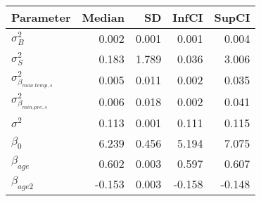 \begin{table}[ht]
\centering
\begin{tabular}{lrrrr}
  \hline
Parameter & Median & SD & InfCI & SupCI \\ 
  \hline
$\sigma^{2}_{B}$ & 0.002 & 0.001 & 0.001 & 0.004 \\ 
  $\sigma^{2}_{S}$ & 0.183 & 1.789 & 0.036 & 3.006 \\ 
  $\sigma^{2}_{\beta_{max.temp,s}}$ & 0.005 & 0.011 & 0.002 & 0.035 \\ 
  $\sigma^{2}_{\beta_{min.pre,s}}$ & 0.006 & 0.018 & 0.002 & 0.041 \\ 
  $\sigma^{2}$ & 0.113 & 0.001 & 0.111 & 0.115 \\ 
  $\beta_{0}$ & 6.239 & 0.456 & 5.194 & 7.075 \\ 
  $\beta_{age}$ & 0.602 & 0.003 & 0.597 & 0.607 \\ 
  $\beta_{age2}$ & -0.153 & 0.003 & -0.158 & -0.148 \\ 
   \hline
\end{tabular}
\end{table}
